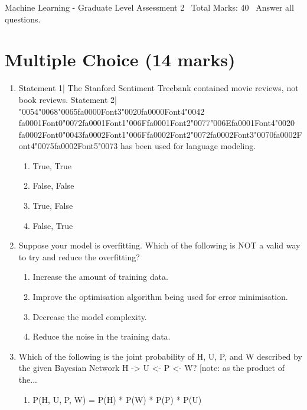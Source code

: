 \documentclass[12pt]{article}
\begin{document}
\begin{center}
Machine Learning - Graduate Level Assessment 2 \
Total Marks: 40 \
Answer all questions.
\end{center}

\section*{Multiple Choice (14 marks)}
\begin{enumerate}[label=\arabic*.]
\item Statement 1| The Stanford Sentiment Treebank contained movie reviews, not book reviews. Statement 2| {\char"0054}{\char"0068}{\char"0065}{\csname fa0000Font3\endcsname\char"0020}{\csname fa0000Font4\endcsname\char"0042} {\csname fa0001Font0\endcsname\char"0072}{\csname fa0001Font1\endcsname\char"006F}{\csname fa0001Font2\endcsname\char"0077}{\char"006E}{\csname fa0001Font4\endcsname\char"0020} {\csname fa0002Font0\endcsname\char"0043}{\csname fa0002Font1\endcsname\char"006F}{\csname fa0002Font2\endcsname\char"0072}{\csname fa0002Font3\endcsname\char"0070}{\csname fa0002Font4\endcsname\char"0075}{\csname fa0002Font5\endcsname\char"0073} has been used for language modeling.
\begin{enumerate}[label=(\alph*)]
    \item True, True
    \item False, False
    \item True, False
    \item False, True
\end{enumerate}
\item Suppose your model is overfitting. Which of the following is NOT a valid way to try and reduce the overfitting?
\begin{enumerate}[label=(\alph*)]
    \item Increase the amount of training data.
    \item Improve the optimisation algorithm being used for error minimisation.
    \item Decrease the model complexity.
    \item Reduce the noise in the training data.
\end{enumerate}
\item Which of the following is the joint probability of H, U, P, and W described by the given Bayesian Network H -> U <- P <- W? [note: as the product of the...
\begin{enumerate}[label=(\alph*)]
    \item P(H, U, P, W) = P(H) * P(W) * P(P) * P(U)

\end{enumerate}
\end{enumerate}
\end{document}
